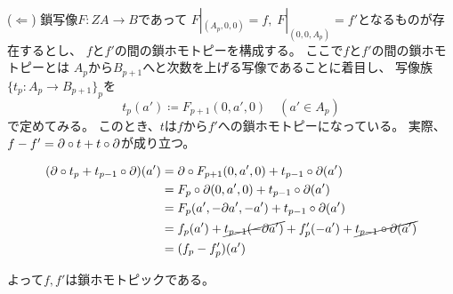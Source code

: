 \documentclass[report]{jlreq}
\begin{document}
\begin{answer}
    ($\Leftarrow$) \quad
    鎖写像$F \colon ZA \to B$であって
    $F|_{(A_p, 0, 0)} = f, \; F|_{(0, 0, A_p)} = f'$となるものが存在するとし、
    $f$と$f'$の間の鎖ホモトピーを構成する。
    ここで$f$と$f'$の間の鎖ホモトピーとは
    $A_{p}$から$B_{p + 1}$へと次数を上げる写像であることに着目し、
    写像族$\{ t_p \colon A_{p} \to B_{p + 1} \}_p$を
    \begin{equation}
        t_p (a') \coloneqq F_{p + 1}(0, a', 0)
        \quad (a' \in A_{p})
    \end{equation}
    で定めてみる。
    このとき、$t$は$f$から$f'$への鎖ホモトピーになっている。
    実際、$f - f' = \partial \circ t + t \circ \partial$が成り立つ。
    \begin{innerproof}
        \begin{alignat}{1}
            (\partial \circ t_p + t_{p - 1} \circ \partial) (a')
                &= \partial \circ F_{p + 1} (0, a', 0)
                    + t_{p - 1} \circ \partial (a') \\
                &= F_p \circ \partial (0, a', 0)
                    + t_{p - 1} \circ \partial (a') \\
                &= F_p (a', - \partial a', - a')
                    + t_{p - 1} \circ \partial (a') \\
                &= f_p (a') + \cancel{t_{p - 1} (- \partial a')} + f'_p (- a')
                    + \cancel{t_{p - 1} \circ \partial (a')} \\
                &= (f_p - f'_p) (a')
        \end{alignat}
    \end{innerproof}
    よって$f, f'$は鎖ホモトピックである。


\end{answer}
\end{document}
